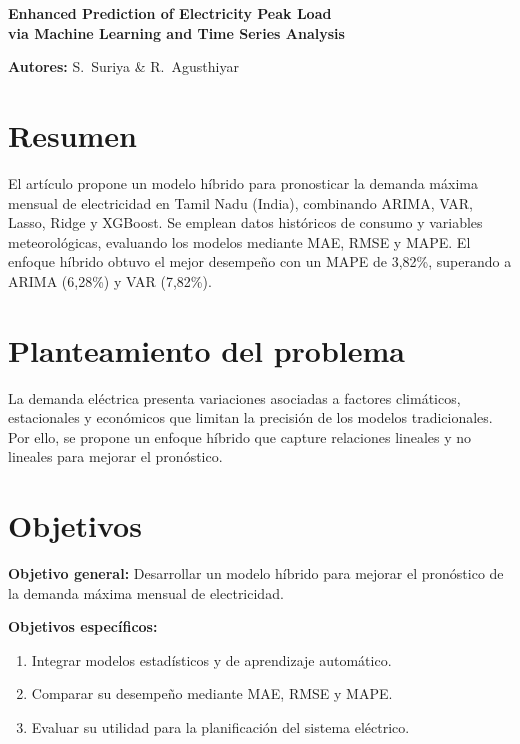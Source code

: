 \begin{center}
	{\Large\bfseries Enhanced Prediction of Electricity Peak Load\\[0.2em]
		via Machine Learning and Time Series Analysis\par}
	\vspace{0.35em}
	{\small \textbf{Autores:} S.~Suriya \& R.~Agusthiyar\par}
\end{center}

\section*{Resumen}

El artículo propone un modelo híbrido para pronosticar la demanda máxima mensual de electricidad en Tamil Nadu (India), combinando ARIMA, VAR, Lasso, Ridge y XGBoost. Se emplean datos históricos de consumo y variables meteorológicas, evaluando los modelos mediante MAE, RMSE y MAPE. El enfoque híbrido obtuvo el mejor desempeño con un MAPE de 3,82\%, superando a ARIMA (6,28\%) y VAR (7,82\%).

\section*{Planteamiento del problema}

La demanda eléctrica presenta variaciones asociadas a factores climáticos, estacionales y económicos que limitan la precisión de los modelos tradicionales. Por ello, se propone un enfoque híbrido que capture relaciones lineales y no lineales para mejorar el pronóstico.

\section*{Objetivos}

\noindent\textbf{Objetivo general:} Desarrollar un modelo híbrido para mejorar el pronóstico de la demanda máxima mensual de electricidad.

\noindent\textbf{Objetivos específicos:}
\begin{enumerate}
    \item Integrar modelos estadísticos y de aprendizaje automático.
    \item Comparar su desempeño mediante MAE, RMSE y MAPE.
    \item Evaluar su utilidad para la planificación del sistema eléctrico.
\end{enumerate}

